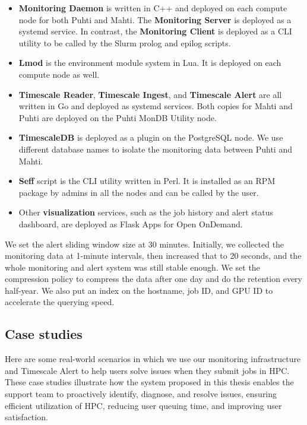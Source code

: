 \begin{itemize}
    \item \textbf{Monitoring Daemon} is written in C++ and deployed on each compute node for both Puhti and Mahti. The \textbf{Monitoring Server} is deployed as a systemd service. In contrast, the \textbf{Monitoring Client} is deployed as a CLI utility to be called by the Slurm prolog and epilog scripts.
    \item \textbf{Lmod} is the environment module system in Lua. It is deployed on each compute node as well.
    \item \textbf{Timescale Reader}, \textbf{Timescale Ingest}, and \textbf{Timescale Alert} are all written in Go and deployed as systemd services. Both copies for Mahti and Puhti are deployed on the Puhti MonDB Utility node.
    \item \textbf{TimescaleDB} is deployed as a plugin on the PostgreSQL node. We use different database names to isolate the monitoring data between Puhti and Mahti.
    \item \textbf{Seff} script is the CLI utility written in Perl. It is installed as an RPM package by admins in all the nodes and can be called by the user.
    \item Other \textbf{visualization} services, such as the job history and alert status dashboard, are deployed as Flask Apps for Open OnDemand.
\end{itemize}

We set the alert sliding window size at 30 minutes. Initially, we collected the monitoring data at 1-minute intervals, then increased that to 20 seconds, and the whole monitoring and alert system was still stable enough. We set the compression policy to compress the data after one day and do the retention every half-year. We also put an index on the hostname, job ID, and GPU ID to accelerate the querying speed.

\subsection{Case studies}
Here are some real-world scenarios in which we use our monitoring infrastructure and Timescale Alert to help users solve issues when they submit jobs in HPC. These case studies illustrate how the system proposed in this thesis enables the support team to proactively identify, diagnose, and resolve issues, ensuring efficient utilization of HPC, reducing user queuing time, and improving user satisfaction.

